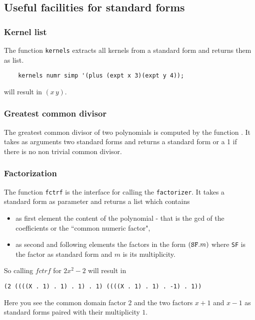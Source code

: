 \subsection{Useful facilities for standard forms}

\subsubsection{Kernel list}

The function {\tt kernels} extracts all kernels
from a standard form and returns them as list.
\begin{verbatim}
    kernels numr simp '(plus (expt x 3)(expt y 4));
\end{verbatim}
\noindent
will result in $(x\,y)$.


\subsubsection{Greatest common divisor}

The greatest common divisor of two polynomials is computed
by the function . It takes as arguments
two standard forms and returns a standard form or a 1
if there is no non trivial common divisor.

\subsubsection{Factorization}

The function {\tt fctrf} is the interface for calling the 
{\tt factorizer}. It takes a standard form as parameter
and returns a list which contains

\begin{itemize}
\item as first element the content of the polynomial - that is
the gcd of the coefficients or the ``common numeric factor",
\item as second and following elements the factors in the
form $({\tt SF} . m)$ where {\tt SF} is the factor as standard
form and $m$ is its multiplicity. 
\end{itemize}
So calling $fctrf$ for  $2x^2-2$ will result in
\begin{verbatim}
(2 ((((X . 1) . 1) . 1) . 1) ((((X . 1) . 1) . -1) . 1))
\end{verbatim}

Here you see the common domain factor 2 and the two factors
$x+1$ and $x-1$ as standard forms paired with their multiplicity
$1$.

